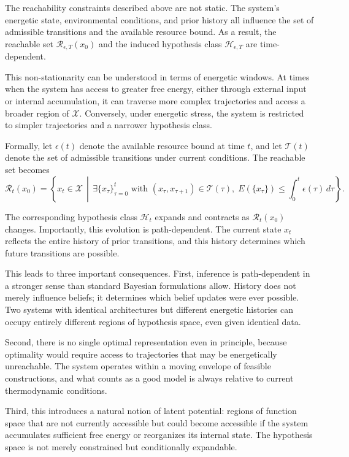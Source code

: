 \documentclass[12pt]{article}
\theoremstyle{plain}
\theoremstyle{definition}
\theoremstyle{remark}
\begin{document}
The reachability constraints described above are not static. The system's energetic state, environmental conditions, and prior history all influence the set of admissible transitions and the available resource bound. As a result, the reachable set $\mathcal{R}_{\epsilon,T}(x_0)$ and the induced hypothesis class $\mathcal{H}_{\epsilon,T}$ are time-dependent.

This non-stationarity can be understood in terms of energetic windows. At times when the system has access to greater free energy, either through external input or internal accumulation, it can traverse more complex trajectories and access a broader region of $\mathcal{X}$. Conversely, under energetic stress, the system is restricted to simpler trajectories and a narrower hypothesis class.

Formally, let $\epsilon(t)$ denote the available resource bound at time $t$, and let $\mathcal{T}(t)$ denote the set of admissible transitions under current conditions. The reachable set becomes
\[
\mathcal{R}_{t}(x_0) = \left\{ x_t \in \mathcal{X} \,\middle|\, \exists \{x_\tau\}_{\tau=0}^t \text{ with } (x_\tau, x_{\tau+1}) \in \mathcal{T}(\tau), \; E(\{x_\tau\}) \leq \int_0^t \epsilon(\tau)\, d\tau \right\}.
\]

The corresponding hypothesis class $\mathcal{H}_t$ expands and contracts as $\mathcal{R}_t(x_0)$ changes. Importantly, this evolution is path-dependent. The current state $x_t$ reflects the entire history of prior transitions, and this history determines which future transitions are possible.

This leads to three important consequences. First, inference is path-dependent in a stronger sense than standard Bayesian formulations allow. History does not merely influence beliefs; it determines which belief updates were ever possible. Two systems with identical architectures but different energetic histories can occupy entirely different regions of hypothesis space, even given identical data.

Second, there is no single optimal representation even in principle, because optimality would require access to trajectories that may be energetically unreachable. The system operates within a moving envelope of feasible constructions, and what counts as a good model is always relative to current thermodynamic conditions.

Third, this introduces a natural notion of latent potential: regions of function space that are not currently accessible but could become accessible if the system accumulates sufficient free energy or reorganizes its internal state. The hypothesis space is not merely constrained but conditionally expandable.
\end{document}
